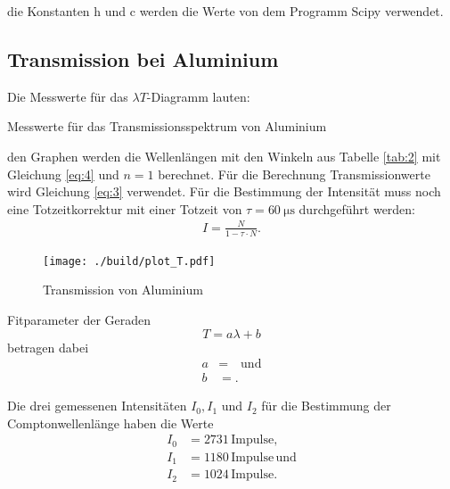 \justifying die Konstanten h und c werden die Werte von dem Programm Scipy  \cite{scipy} verwendet.

\subsection{Transmission bei Aluminium}

Die Messwerte für das $\lambda T$-Diagramm lauten:  

\begin{table}[H]
    \centering
    
    \caption{Messwerte für das Transmissionsspektrum von Aluminium}
    \label{tab:2}
\end{table}


\justifying den Graphen werden die Wellenlängen mit den Winkeln aus Tabelle \ref{tab:2}
mit Gleichung \eqref{eq:4} und $n=1$ berechnet.
Für die Berechnung Transmissionwerte wird Gleichung \eqref{eq:3} verwendet.
Für die Bestimmung der Intensität muss noch eine Totzeitkorrektur mit einer
Totzeit von $\tau = \SI{60}{\micro\second} $ durchgeführt werden:
\begin{align}
    I = \frac{N}{1-\tau \cdot N} \label{eq:9}.
\end{align}

\begin{figure}[H]
    \centering
    \texttt{[image: ./build/plot\_T.pdf]}
    \caption{Transmission von Aluminium}
    \label{fig:4}
\end{figure}

 Fitparameter der Geraden
\begin{equation}
    T=a \lambda +b \label{eq:10}
\end{equation}
betragen dabei
\begin{align}
    a &= \text{}\quad \text{und} \label{eq:11} \\
    b &= \text{}.\label{eq:12}
\end{align}

Die drei gemessenen Intensitäten $I_0, I_1$ und $I_2$ für die Bestimmung der Comptonwellenlänge
haben die Werte
\begin{subequations}
\begin{align}
    I_0 &= 2731 \,\text{Impulse} \label{eq:13a}, \\
    I_1 &= 1180\,\text{Impulse}\, \label{eq:13b} \text{und} \\
    I_2 &=1024 \,\text{Impulse}\label{eq:13c}.
\end{align}
\end{subequations}

